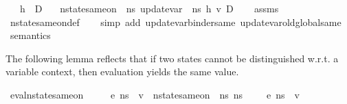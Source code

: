 \begin{isabellebody}
\ \ \ {\isachardoublequoteopen}h\ {\isasymin}\ D{\isachardoublequoteclose}\isanewline
\ \ \ {\isachardoublequoteopen}nstate{\isacharunderscore}{\kern0pt}same{\isacharunderscore}{\kern0pt}on\ {\isasymLambda}\ ns{}\ {\isacharparenleft}{\kern0pt}update{\isacharunderscore}{\kern0pt}var\ {\isasymLambda}\ ns{}\ h\ v{\isacharparenright}{\kern0pt}\ D{\isachardoublequoteclose}\isanewline
%
\isadelimproof
\ \ %
\endisadelimproof
%
\isatagproof
{}\isamarkupfalse%
\ assms\isanewline
\ \ \isamarkupfalse%
\ nstate{\isacharunderscore}{\kern0pt}same{\isacharunderscore}{\kern0pt}on{\isacharunderscore}{\kern0pt}def\isanewline
\ \ \isamarkupfalse%
\ {\isacharparenleft}{\kern0pt}simp\ add{\isacharcolon}{\kern0pt}\ update{\isacharunderscore}{\kern0pt}var{\isacharunderscore}{\kern0pt}binder{\isacharunderscore}{\kern0pt}same\ update{\isacharunderscore}{\kern0pt}var{\isacharunderscore}{\kern0pt}old{\isacharunderscore}{\kern0pt}global{\isacharunderscore}{\kern0pt}same{\isacharparenright}{\kern0pt}%
\endisatagproof
{\isafoldproof}%
%
\isadelimproof
\isanewline
%
\endisadelimproof
\isanewline
\isanewline
{}\isamarkupfalse%
\ semantics\ %
\begin{isamarkuptext}%
The following lemma reflects that if two states cannot be distinguished w.r.t. a variable context,
then evaluation yields the same value.%
\end{isamarkuptext}\isamarkuptrue%
\isamarkupfalse%
\ eval{\isacharunderscore}{\kern0pt}nstate{\isacharunderscore}{\kern0pt}same{\isacharunderscore}{\kern0pt}on{\isacharcolon}{\kern0pt}\isanewline
\ \ \ {\isachardoublequoteopen}{\isasymLambda}{\isacharcomma}{\kern0pt}{\isasymGamma}{\isacharcomma}{\kern0pt}{\isasymOmega}\ {\isasymturnstile}\ {\isasymlangle}e{\isacharcomma}{\kern0pt}\ ns{}{\isasymrangle}\ {\isasymDown}\ v\ {\isasymLongrightarrow}\ nstate{\isacharunderscore}{\kern0pt}same{\isacharunderscore}{\kern0pt}on\ {\isasymLambda}\ ns{}\ ns{}\ {\isacharbraceleft}{\kern0pt}{\isacharbraceright}{\kern0pt}\ {\isasymLongrightarrow}\ {\isasymLambda}{\isacharcomma}{\kern0pt}{\isasymGamma}{\isacharcomma}{\kern0pt}{\isasymOmega}\ {\isasymturnstile}\ {\isasymlangle}e{\isacharcomma}{\kern0pt}\ ns{}{\isasymrangle}\ {\isasymDown}\ v{\isachardoublequoteclose}\ \ \isanewline

\end{isabellebody}
